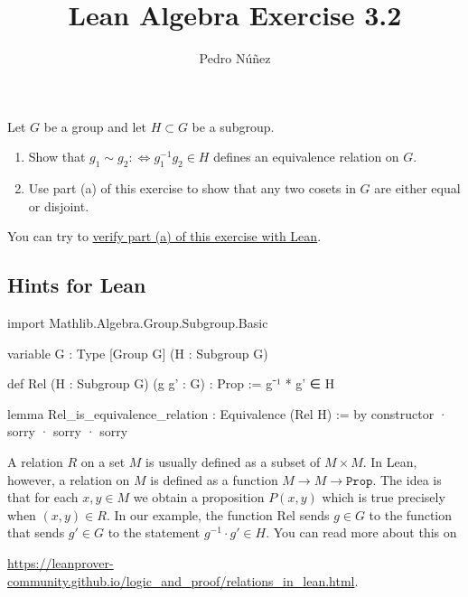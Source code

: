 \documentclass[12pt, a4paper]{article}
\title{Lean Algebra Exercise 3.2}
\author{Pedro N\'{u}\~{n}ez}
\theoremstyle{definition}
\newenvironment{xca}[1] {\renewcommand\theinnercustomthm{#1}\innercustomthm}
  {\endinnercustomthm}
\begin{document}
\begin{xca}{3.2}
  Let $G$ be a group and let $H \subset G$ be a subgroup.
  \begin{enumerate}[label=(\alph*)]
    \item Show that $g_{1} \sim g_{2} : \Leftrightarrow g_{1}^{-1}g_{2} \in H$ defines an equivalence relation on $G$.
    \item Use part (a) of this exercise to show that any two cosets in $G$ are either equal or disjoint.
  \end{enumerate}

  You can try to \href{https://live.lean-lang.org/#codez=JYWwDg9gTgLgBAWQIYwBYBtgCMB0BBdAcwFMsokcBxKCAVzBwGVatCb6cAhJAZ2AGMAUIIBuSKMCRZ0xOAG9KcAFxwAKgE8wxAL5wA2tTpg4lALpwAFAAllcZq3bHKASmEATYgDM4AJWLpLGxV7NiMTZ0tCOEIAclsXWwAFGmMlAF5owG8CAE64ACpouMAIIjgrYRkQECRffwB9YB5a4gBHWmAxGQA7fmJaqH8UYAhO2wBRVvakLp7LPwCrCPS4LHVBODh%2BYZ4YKFp%2BGGg1uAB2uB5oKFX10%2FOoS6Obi%2FUgA}{verify part (a) of this exercise with Lean}.
\end{xca}

\subsection*{Hints for Lean}

\begin{leancode}
  import Mathlib.Algebra.Group.Subgroup.Basic

  variable {G : Type} [Group G] (H : Subgroup G)

  def Rel (H : Subgroup G) (g g' : G) : Prop := g⁻¹ * g' ∈ H

  lemma Rel_is_equivalence_relation : Equivalence (Rel H) := by
    constructor
    · sorry
    · sorry
    · sorry
\end{leancode}

A relation $R$ on a set $M$ is usually defined as a subset of $M \times M$.
In Lean, however, a relation on $M$ is defined as a function $M \to M \to \mathtt{Prop}$.
The idea is that for each $x, y \in M$ we obtain a proposition $P(x,y)$ which is {\ttfamily true} precisely when $(x,y) \in R$.
In our example, the function $\mathrm{Rel}$ sends $g \in G$ to the function that sends $g' \in G$ to the statement $g^{-1} \cdot g' \in H$.
You can read more about this on
\begin{center}
  \href{https://leanprover-community.github.io/logic_and_proof/relations_in_lean.html}{https://leanprover-community.github.io/logic\_and\_proof/relations\_in\_lean.html}.
\end{center}
\end{document}
